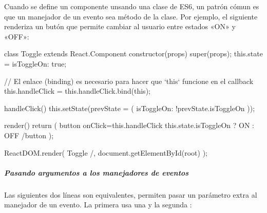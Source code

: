 Cuando se define un componente unsando una clase de ES6, un patrón cómun es que
un manejador de un evento sea método de la clase. Por ejemplo, el siguiente
 renderiza un butón que permite cambiar al usuario entre estados
«ON» y «OFF»:

%
\begin{sphinxVerbatim}[commandchars=\\\{\}]
class Toggle extends React.Component \PYGZob{}
  constructor(props) \PYGZob{}
    super(props);
    this.state = \PYGZob{}isToggleOn: true\PYGZcb{};

    // El enlace (binding) es necesario para hacer que {}`this{}` funcione en el callback
    this.handleClick = this.handleClick.bind(this);
  \PYGZcb{}

  handleClick() \PYGZob{}
    this.setState(prevState =\PYGZgt{} (\PYGZob{}
      isToggleOn: !prevState.isToggleOn
    \PYGZcb{}));
  \PYGZcb{}

  render() \PYGZob{}
    return (
      \PYGZlt{}button onClick=\PYGZob{}this.handleClick\PYGZcb{}\PYGZgt{}
        \PYGZob{}this.state.isToggleOn ? \PYGZsq{}ON\PYGZsq{} : \PYGZsq{}OFF\PYGZsq{}\PYGZcb{}
      \PYGZlt{}/button\PYGZgt{}
    );
  \PYGZcb{}
\PYGZcb{}

ReactDOM.render(
  \PYGZlt{}Toggle /\PYGZgt{},
  document.getElementById(\PYGZsq{}root\PYGZsq{})
);
\end{sphinxVerbatim}


\subparagraph{Pasando argumentos a los manejadores de eventos}
\label{\detokenize{reactjs:pasando-argumentos-a-los-manejadores-de-eventos}}
Las siguientes dos líneas son equivalentes, permiten pasar un parámetro extra al
manejador de un evento. La primera usa una  y la segunda
:

%
\begin{sphinxVerbatim}[commandchars=\\\{\}]
     
   
\end{sphinxVerbatim}

